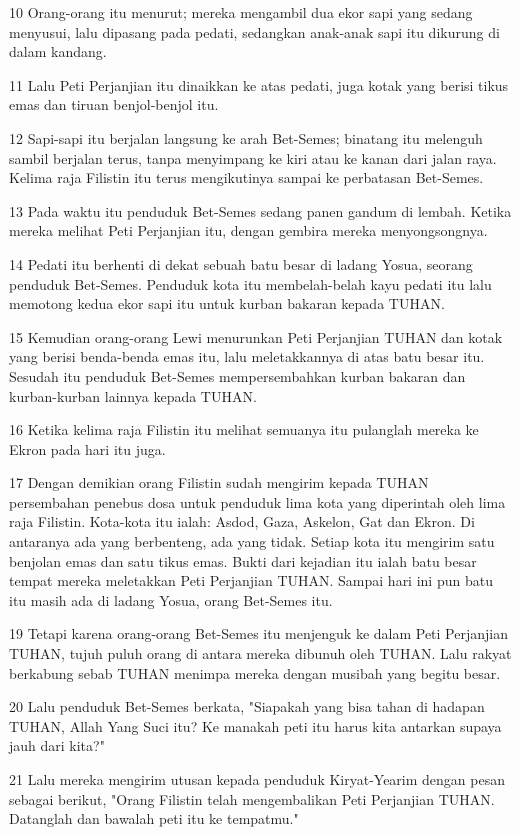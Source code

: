 \par 10 Orang-orang itu menurut; mereka mengambil dua ekor sapi yang sedang menyusui, lalu dipasang pada pedati, sedangkan anak-anak sapi itu dikurung di dalam kandang.
\par 11 Lalu Peti Perjanjian itu dinaikkan ke atas pedati, juga kotak yang berisi tikus emas dan tiruan benjol-benjol itu.
\par 12 Sapi-sapi itu berjalan langsung ke arah Bet-Semes; binatang itu melenguh sambil berjalan terus, tanpa menyimpang ke kiri atau ke kanan dari jalan raya. Kelima raja Filistin itu terus mengikutinya sampai ke perbatasan Bet-Semes.
\par 13 Pada waktu itu penduduk Bet-Semes sedang panen gandum di lembah. Ketika mereka melihat Peti Perjanjian itu, dengan gembira mereka menyongsongnya.
\par 14 Pedati itu berhenti di dekat sebuah batu besar di ladang Yosua, seorang penduduk Bet-Semes. Penduduk kota itu membelah-belah kayu pedati itu lalu memotong kedua ekor sapi itu untuk kurban bakaran kepada TUHAN.
\par 15 Kemudian orang-orang Lewi menurunkan Peti Perjanjian TUHAN dan kotak yang berisi benda-benda emas itu, lalu meletakkannya di atas batu besar itu. Sesudah itu penduduk Bet-Semes mempersembahkan kurban bakaran dan kurban-kurban lainnya kepada TUHAN.
\par 16 Ketika kelima raja Filistin itu melihat semuanya itu pulanglah mereka ke Ekron pada hari itu juga.
\par 17 Dengan demikian orang Filistin sudah mengirim kepada TUHAN persembahan penebus dosa untuk penduduk lima kota yang diperintah oleh lima raja Filistin. Kota-kota itu ialah: Asdod, Gaza, Askelon, Gat dan Ekron. Di antaranya ada yang berbenteng, ada yang tidak. Setiap kota itu mengirim satu benjolan emas dan satu tikus emas. Bukti dari kejadian itu ialah batu besar tempat mereka meletakkan Peti Perjanjian TUHAN. Sampai hari ini pun batu itu masih ada di ladang Yosua, orang Bet-Semes itu.
\par 19 Tetapi karena orang-orang Bet-Semes itu menjenguk ke dalam Peti Perjanjian TUHAN, tujuh puluh orang di antara mereka dibunuh oleh TUHAN. Lalu rakyat berkabung sebab TUHAN menimpa mereka dengan musibah yang begitu besar.
\par 20 Lalu penduduk Bet-Semes berkata, "Siapakah yang bisa tahan di hadapan TUHAN, Allah Yang Suci itu? Ke manakah peti itu harus kita antarkan supaya jauh dari kita?"
\par 21 Lalu mereka mengirim utusan kepada penduduk Kiryat-Yearim dengan pesan sebagai berikut, "Orang Filistin telah mengembalikan Peti Perjanjian TUHAN. Datanglah dan bawalah peti itu ke tempatmu."

